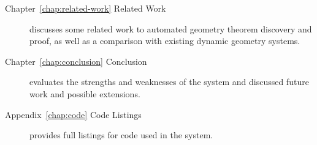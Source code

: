 \begin{description}
\item[Chapter~\ref{chap:related-work} Related Work] discusses some
  related work to automated geometry theorem discovery and proof, as
  well as a comparison with existing dynamic geometry systems.

\item[Chapter~\ref{chap:conclusion} Conclusion] evaluates the strengths and
  weaknesses of the system and discussed future work and possible extensions.

\item[Appendix~\ref{chap:code} Code Listings] provides full listings for code
  used in the system.

\end{description}
